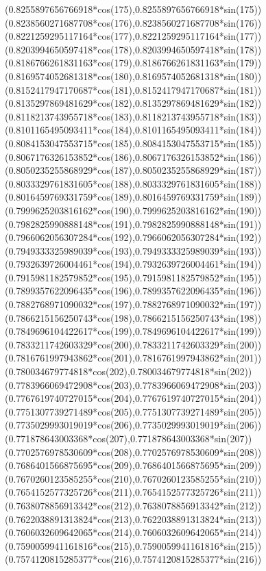 {({0.8255897656766918*cos(175)},{0.8255897656766918*sin(175)})
({0.8238560271687708*cos(176)},{0.8238560271687708*sin(176)})
({0.8221259295117164*cos(177)},{0.8221259295117164*sin(177)})
({0.8203994650597418*cos(178)},{0.8203994650597418*sin(178)})
({0.8186766261831163*cos(179)},{0.8186766261831163*sin(179)})
({0.8169574052681318*cos(180)},{0.8169574052681318*sin(180)})
({0.8152417947170687*cos(181)},{0.8152417947170687*sin(181)})
({0.8135297869481629*cos(182)},{0.8135297869481629*sin(182)})
({0.8118213743955718*cos(183)},{0.8118213743955718*sin(183)})
({0.8101165495093411*cos(184)},{0.8101165495093411*sin(184)})
({0.8084153047553715*cos(185)},{0.8084153047553715*sin(185)})
({0.8067176326153852*cos(186)},{0.8067176326153852*sin(186)})
({0.8050235255868929*cos(187)},{0.8050235255868929*sin(187)})
({0.8033329761831605*cos(188)},{0.8033329761831605*sin(188)})
({0.8016459769331759*cos(189)},{0.8016459769331759*sin(189)})
({0.7999625203816162*cos(190)},{0.7999625203816162*sin(190)})
({0.7982825990888148*cos(191)},{0.7982825990888148*sin(191)})
({0.7966062056307284*cos(192)},{0.7966062056307284*sin(192)})
({0.7949333325989039*cos(193)},{0.7949333325989039*sin(193)})
({0.7932639726004461*cos(194)},{0.7932639726004461*sin(194)})
({0.7915981182579852*cos(195)},{0.7915981182579852*sin(195)})
({0.7899357622096435*cos(196)},{0.7899357622096435*sin(196)})
({0.7882768971090032*cos(197)},{0.7882768971090032*sin(197)})
({0.7866215156250743*cos(198)},{0.7866215156250743*sin(198)})
({0.7849696104422617*cos(199)},{0.7849696104422617*sin(199)})
({0.7833211742603329*cos(200)},{0.7833211742603329*sin(200)})
({0.7816761997943862*cos(201)},{0.7816761997943862*sin(201)})
({0.780034679774818*cos(202)},{0.780034679774818*sin(202)})
({0.7783966069472908*cos(203)},{0.7783966069472908*sin(203)})
({0.7767619740727015*cos(204)},{0.7767619740727015*sin(204)})
({0.7751307739271489*cos(205)},{0.7751307739271489*sin(205)})
({0.7735029993019019*cos(206)},{0.7735029993019019*sin(206)})
({0.771878643003368*cos(207)},{0.771878643003368*sin(207)})
({0.7702576978530609*cos(208)},{0.7702576978530609*sin(208)})
({0.7686401566875695*cos(209)},{0.7686401566875695*sin(209)})
({0.7670260123585255*cos(210)},{0.7670260123585255*sin(210)})
({0.7654152577325726*cos(211)},{0.7654152577325726*sin(211)})
({0.7638078856913342*cos(212)},{0.7638078856913342*sin(212)})
({0.7622038891313824*cos(213)},{0.7622038891313824*sin(213)})
({0.7606032609642065*cos(214)},{0.7606032609642065*sin(214)})
({0.7590059941161816*cos(215)},{0.7590059941161816*sin(215)})
({0.7574120815285377*cos(216)},{0.7574120815285377*sin(216)})
}
